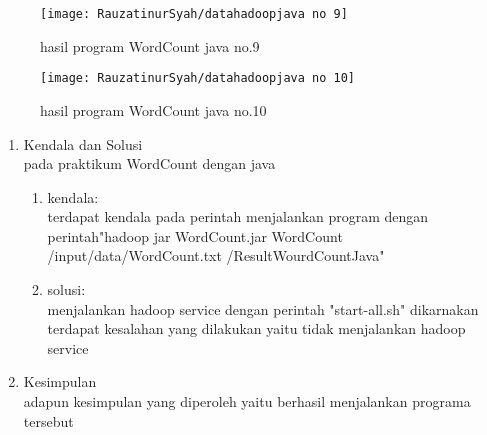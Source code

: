 \begin{figure}[!ht]
\texttt{[image: RauzatinurSyah/datahadoopjava no 9]}
\caption{hasil program WordCount java no.9}
\label{gam:hasil program}
\end{figure}

\begin{figure}[!ht]
\texttt{[image: RauzatinurSyah/datahadoopjava no 10]}
\caption{hasil program WordCount java no.10}
\label{gam:hasil program}
\end{figure}

\begin{enumerate}
\item Kendala dan Solusi \\
pada praktikum WordCount dengan java
\begin{enumerate}
\item kendala: \\
terdapat kendala pada perintah menjalankan program dengan perintah"hadoop jar WordCount.jar WordCount /input/data/WordCount.txt /ResultWourdCountJava"
\item solusi: \\
menjalankan hadoop service dengan perintah "start-all.sh" dikarnakan terdapat kesalahan yang dilakukan yaitu tidak menjalankan hadoop service
\end{enumerate}
\item Kesimpulan\\
adapun kesimpulan yang diperoleh yaitu berhasil menjalankan programa tersebut 
\end{enumerate}
